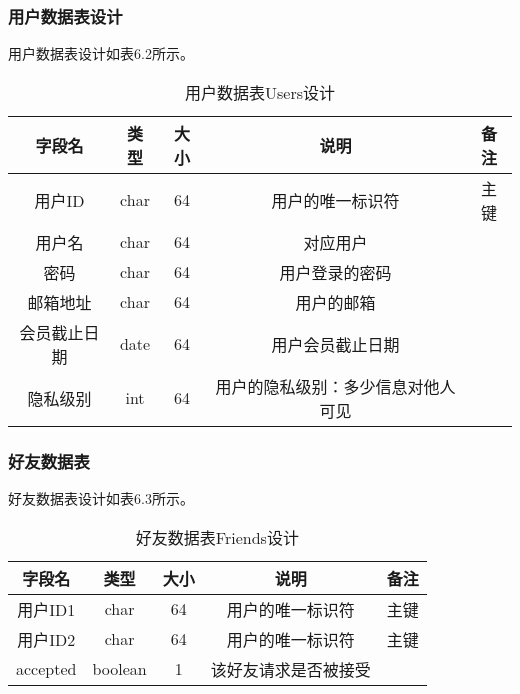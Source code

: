 {
\color{red}
\subsubsection{用户数据表设计}
用户数据表设计如表6.2所示。
\begin{table}[htbp]
\centering
\caption{用户数据表Users设计} \label{tab:user-database}
\begin{tabular}{|c|c|c|c|c|}
    \hline
    字段名 & 类型 & 大小 & 说明 & 备注 \\
    \hline
    用户ID & char & 64 & 用户的唯一标识符 & 主键\\
    \hline
    用户名 & char & 64 & 对应用户 & \\
    \hline
    密码 & char & 64 & 用户登录的密码 & \\
    \hline
    邮箱地址 & char & 64 & 用户的邮箱 & \\
    \hline
    会员截止日期 & date & 64 & 用户会员截止日期 & \\
    \hline
    隐私级别 & int & 64 & 用户的隐私级别：多少信息对他人可见 & \\
    \hline
\end{tabular}
\end{table}

\subsubsection{好友数据表}
好友数据表设计如表6.3所示。
\begin{table}[htbp]
\centering
\caption{好友数据表Friends设计} \label{tab:friend-database}
\begin{tabular}{|c|c|c|c|c|}
    \hline
    字段名 & 类型 & 大小 & 说明 & 备注 \\
    \hline
    用户ID1 & char & 64 & 用户的唯一标识符 & 主键\\
    \hline
    用户ID2 & char & 64 & 用户的唯一标识符 & 主键\\
    \hline
    accepted  & boolean & 1 & 该好友请求是否被接受 & \\
    \hline
\end{tabular}
\end{table}

}


